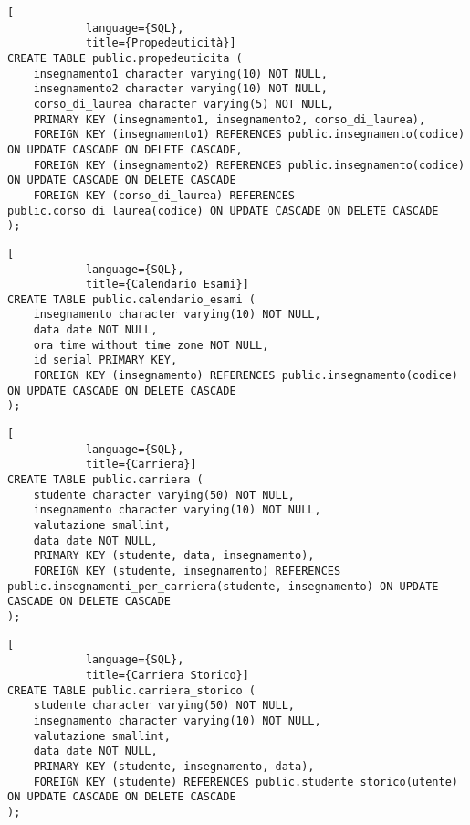 \documentclass{article}
\begin{document}
\begin{enumerate}
        \begin{lstlisting}[
            language={SQL},
            title={Propedeuticità}]
CREATE TABLE public.propedeuticita (
    insegnamento1 character varying(10) NOT NULL,
    insegnamento2 character varying(10) NOT NULL,
    corso_di_laurea character varying(5) NOT NULL,
    PRIMARY KEY (insegnamento1, insegnamento2, corso_di_laurea),
    FOREIGN KEY (insegnamento1) REFERENCES public.insegnamento(codice) ON UPDATE CASCADE ON DELETE CASCADE,
    FOREIGN KEY (insegnamento2) REFERENCES public.insegnamento(codice) ON UPDATE CASCADE ON DELETE CASCADE
    FOREIGN KEY (corso_di_laurea) REFERENCES public.corso_di_laurea(codice) ON UPDATE CASCADE ON DELETE CASCADE
);
        \end{lstlisting}



        \begin{lstlisting}[
            language={SQL},
            title={Calendario Esami}]
CREATE TABLE public.calendario_esami (
    insegnamento character varying(10) NOT NULL,
    data date NOT NULL,
    ora time without time zone NOT NULL,
    id serial PRIMARY KEY,
    FOREIGN KEY (insegnamento) REFERENCES public.insegnamento(codice) ON UPDATE CASCADE ON DELETE CASCADE
);
        \end{lstlisting}

        \begin{lstlisting}[
            language={SQL},
            title={Carriera}]
CREATE TABLE public.carriera (
    studente character varying(50) NOT NULL,
    insegnamento character varying(10) NOT NULL,
    valutazione smallint,
    data date NOT NULL,
    PRIMARY KEY (studente, data, insegnamento),
    FOREIGN KEY (studente, insegnamento) REFERENCES public.insegnamenti_per_carriera(studente, insegnamento) ON UPDATE CASCADE ON DELETE CASCADE
);
        \end{lstlisting}



        \begin{lstlisting}[
            language={SQL},
            title={Carriera Storico}]
CREATE TABLE public.carriera_storico (
    studente character varying(50) NOT NULL,
    insegnamento character varying(10) NOT NULL,
    valutazione smallint,
    data date NOT NULL,
    PRIMARY KEY (studente, insegnamento, data),
    FOREIGN KEY (studente) REFERENCES public.studente_storico(utente) ON UPDATE CASCADE ON DELETE CASCADE
);
        \end{lstlisting}




\end{enumerate}
\end{document}
